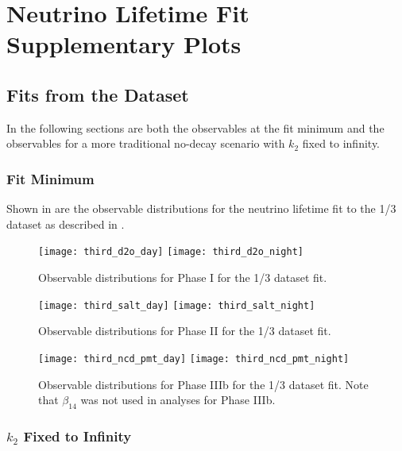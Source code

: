 \chapter{Neutrino Lifetime Fit Supplementary Plots}

\section{Fits from the \texorpdfstring{}{1/3} Dataset}
\label{third_observables}

In the following sections are both the observables at the fit minimum and the observables for a more traditional no-decay scenario with $k_2$ fixed to infinity. 

\subsection{Fit Minimum}

Shown in  are the observable distributions for the neutrino lifetime fit to the 1/3 dataset as described in .

\begin{figure}
\centering
\texttt{[image: third\_d2o\_day]}
\texttt{[image: third\_d2o\_night]}
\caption{\label{fig:third_d2o_obs}Observable distributions for Phase I for the 1/3 dataset fit.}
\end{figure}
\begin{figure}
\centering
\texttt{[image: third\_salt\_day]}
\texttt{[image: third\_salt\_night]}
\caption{\label{fig:third_salt_obs}Observable distributions for Phase II for the 1/3 dataset fit.}
\end{figure}
\begin{figure}
\centering
\texttt{[image: third\_ncd\_pmt\_day]}
\texttt{[image: third\_ncd\_pmt\_night]}
\caption{\label{fig:third_ncd_pmt_obs}Observable distributions for Phase IIIb for the 1/3 dataset fit. Note that $\beta_{14}$ was not used in analyses for Phase IIIb.}
\end{figure}

\clearpage

\subsection{\texorpdfstring{$k_2$}{k2} Fixed to Infinity}

